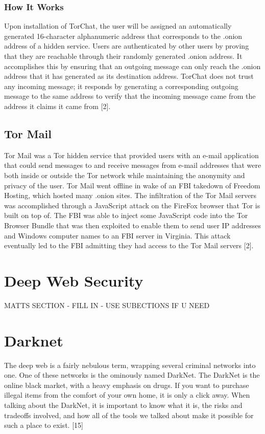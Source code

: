 \documentclass[twocolumn,letterpaper,10pt]{article}
\begin{document}
\subsubsection{How It Works}
Upon installation of TorChat, the user will be assigned an automatically generated 16-character alphanumeric address that corresponds to the .onion address of a hidden service. Users are authenticated by other users by proving that they are reachable through their randomly generated .onion address. It accomplishes this by ensuring that an outgoing message can only reach the .onion address that it has generated as its destination address. TorChat does not trust any incoming message; it responds by generating a corresponding outgoing message to the same address to verify that the incoming message came from the address it claims it came from [2]. 

\subsection{Tor Mail}

Tor Mail was a Tor hidden service that provided users with an e-mail application that could send messages to and receive messages from e-mail addresses that were both inside or outside the Tor network while maintaining the anonymity and privacy of the user. Tor Mail went offline in wake of an FBI takedown of Freedom Hosting, which hosted many .onion sites. The infiltration of the Tor Mail servers was accomplished through a JavaScript attack on the FireFox browser that Tor is built on top of. The FBI was able to inject some JavaScript code into the Tor Browser Bundle that was then exploited to enable them to send user IP addresses and Windows computer names to an FBI server in Virginia. This attack eventually led to the FBI admitting they had access to the Tor Mail servers [2].

\section{Deep Web Security}

MATTS SECTION - FILL IN - USE SUBECTIONS IF U NEED 

\section{Darknet}

The deep web is a fairly nebulous term, wrapping several criminal networks into one. One of these networks is the ominously named DarkNet. The DarkNet is the online black market, with a heavy emphasis on drugs. If you want to purchase illegal items from the comfort of your own home, it is only a click away. When talking about the DarkNet, it is important to know what it is, the risks and tradeoffs involved, and how all of the tools we talked about make it possible for such a place to exist. [15]
\end{document}
